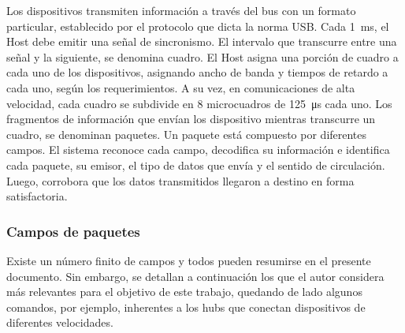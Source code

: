Los dispositivos transmiten información a través del bus con un formato particular, establecido por el protocolo que dicta la norma USB. Cada \SI{1}{\milli\second}, el Host debe emitir una señal de sincronismo. El intervalo que transcurre entre una señal y la siguiente, se denomina cuadro. El Host asigna una porción de cuadro a cada uno de los dispositivos, asignando ancho de banda y tiempos de retardo a cada uno, según los requerimientos. A su vez, en comunicaciones de alta velocidad, cada cuadro se subdivide en 8 microcuadros de \SI{125}{\micro\second} cada uno. Los fragmentos de información que envían los dispositivo mientras transcurre un cuadro, se denominan paquetes. Un paquete está compuesto por diferentes campos. El sistema reconoce cada campo, decodifica su información e identifica cada paquete, su emisor, el tipo de datos que envía y el sentido de circulación. Luego, corrobora que los datos transmitidos llegaron a destino en forma satisfactoria. 

\subsubsection{Campos de paquetes}
	Existe un número finito de campos y todos pueden resumirse en el presente documento. Sin embargo, se detallan a continuación los que el autor considera más relevantes para el objetivo de este trabajo, quedando de lado algunos comandos, por ejemplo, inherentes a los hubs que conectan dispositivos de diferentes velocidades.

